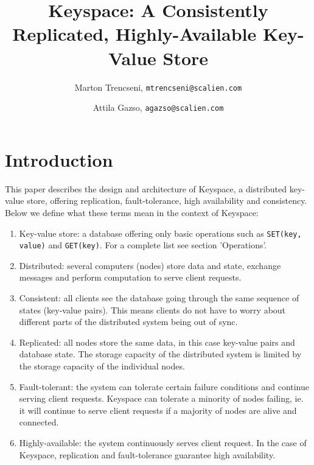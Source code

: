 \documentclass[12pt]{article}
\title{ Keyspace: A Consistently Replicated, Highly-Available Key-Value Store }
\author{ Marton Trencseni, \texttt{mtrencseni@scalien.com} \and Attila Gazso, \texttt{agazso@scalien.com} }
\date{}
\begin{document}
\maketitle

\sloppy
{}

\section{ Introduction }

This paper describes the design and architecture of Keyspace, a distributed key-value store, offering replication, fault-tolerance, high availability and consistency. Below we define what these terms mean in the context of Keyspace:

\begin{enumerate}
\item Key-value store: a database offering only basic operations such as \texttt{SET(key, value)} and \texttt{GET(key)}. For a complete list see section 'Operations'.
\item Distributed: several computers (nodes) store data and state, exchange messages and perform computation to serve client requests.
\item Consistent: all clients see the database going through the same sequence of states (key-value pairs). This means clients do not have to worry about different parts of the distributed system being out of sync.
\item Replicated: all nodes store the same data, in this case key-value pairs and database state. The storage capacity of the distributed system is limited by the storage capacity of the individual nodes.
\item Fault-tolerant: the system can tolerate certain failure conditions and continue serving client requests. Keyspace can tolerate a minority of nodes failing, ie. it will continue to serve client requests if a majority of nodes are alive and connected.
\item Highly-available: the system continuously serves client request. In the case of Keyspace, replication and fault-tolerance guarantee high availability.
\end{enumerate}
\end{document}
